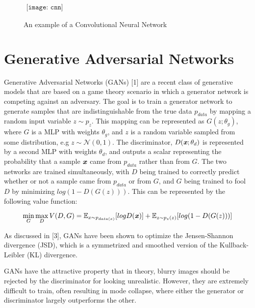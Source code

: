 \documentclass{article}
\begin{document}
\begin{figure}[!htb]
   \begin{center}$
      \begin{array}{cccc}
         \texttt{[image: cnn]}
      \end{array}$
   \end{center}
   \caption{An example of a Convolutional Neural Network}
\end{figure}

\pagebreak

\section{Generative Adversarial Networks}
\noindent Generative Adversarial Networks (GANs) [1] are a recent class of generative models that are based on a game theory scenario in which a generator
network is competing against an adversary. The goal is to train a generator network to generate samples that are indistinguishable from the true data $p_{data}$
by mapping a random input variable $z \sim p_z$. This mapping can be represented as $G(z;\theta_g)$, where $G$ is a MLP with weights $\theta_g$, and $z$ is a random
variable sampled from some distribution, e.g $z \sim \mathcal{N}(0,1)$. The discriminator, $D(\textbf{\textit{x}}; \theta_d)$ is represented by a second MLP with weights
$\theta_d$, and outputs a scalar representing the probability that a sample $\textbf{\textit{x}}$ came from $p_{data}$ rather than from $G$. The two networks are trained
simultaneously, with $D$ being trained to correctly predict whether or not a sample came from $p_{data}$ or from $G$, and $G$ being trained to fool $D$ by minimizing $log(1-D(G(z)))$.
This can be represented by the following value function:

\[\min\limits_{G}\max\limits_{D} V(D,G) = \mathbb{E}_{x \sim p_{data(x)}} [logD(\textbf{\textit{x}})] + \mathbb{E}_{z \sim p_z(z)}[log(1 - D(G(z)))]\]

\noindent As discussed in [3], GANs have been shown to optimize the Jensen-Shannon divergence (JSD), which is a symmetrized and smoothed version of the Kullback-Leibler
(KL) divergence. 

GANs have the attractive property that in theory, blurry images should be rejected by the discriminator for looking unrealistic. However, they are extremely
difficult to train, often resulting in mode collapse, where either the generator or discriminator largely outperforms the other. 
\end{document}
